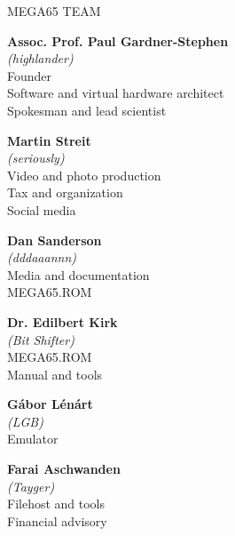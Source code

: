 \newpage
{\huge MEGA65 TEAM}\vspace{1cm}

\begin{mega65thanks}

\begin{minipage}{\linewidth}
    {\large\bf Assoc. Prof. Paul Gardner-Stephen} \\
    \textit{(highlander)} \\
    Founder \\
    Software and virtual hardware architect \\
    Spokesman and lead scientist
\end{minipage}

\begin{minipage}{\linewidth}
    {\large\bf Martin Streit} \\
    \textit{(seriously)} \\
    Video and photo production \\
    Tax and organization \\
    Social media
\end{minipage}

\begin{minipage}{\linewidth}
    {\large\bf Dan Sanderson} \\
    \textit{(dddaaannn)} \\
    Media and documentation \\
    MEGA65.ROM
\end{minipage}

\begin{minipage}{\linewidth}
    {\large\bf Dr. Edilbert Kirk} \\
    \textit{(Bit Shifter)} \\
    MEGA65.ROM \\
    Manual and tools
\end{minipage}

\begin{minipage}{\linewidth}
    {\large\bf Gábor Lénárt} \\
    \textit{(LGB)} \\
    Emulator
\end{minipage}

\begin{minipage}{\linewidth}
    {\large\bf Farai Aschwanden} \\
    \textit{(Tayger)} \\
    Filehost and tools \\
    Financial advisory
\end{minipage}


\end{mega65thanks}
